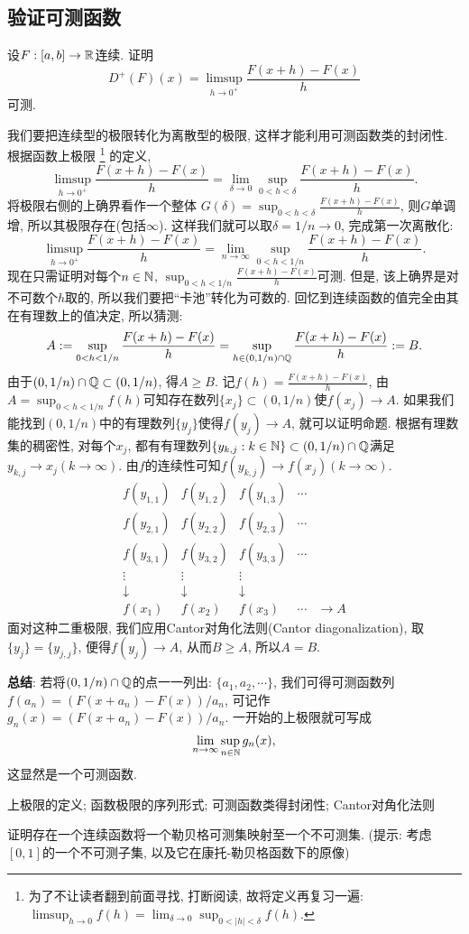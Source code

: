 \subsection{验证可测函数}
\begin{example}[~(Dini导数)] %
    设$F: [a,b] \to \mathbb{R}$连续. 证明
    $$D^+(F)(x) = \limsup_{h \to 0^+}\frac{F(x+h)-F(x)}{h}$$
    可测. 
\end{example}
\begin{solution}
    我们要把连续型的极限转化为离散型的极限, 这样才能利用可测函数类的封闭性. 根据函数上极限
    \footnote{为了不让读者翻到前面寻找, 打断阅读, 故将定义再复习一遍: $\limsup_{h \to 0}f(h) = \lim_{\delta \to  0} \sup_{0<|h|<\delta} f(h)$.}
    的定义,
    $$\limsup_{h \to 0^+}\frac{F(x+h)-F(x)}{h} = 
    \lim_{\delta \to 0}\sup_{0<h<\delta}\frac{F(x+h)-F(x)}{h}.$$
    将极限右侧的上确界看作一个整体
    $\displaystyle{G(\delta)=\sup_{0<h<\delta}\frac{F(x+h)-F(x)}{h} }$, 则$G$单调增, 所以其极限存在(包括$\infty$). 这样我们就可以取$\delta=1/n \to 0$, 完成第一次离散化:
    $$\limsup_{h \to 0^+}\frac{F(x+h)-F(x)}{h} = 
    \lim_{n \to \infty}\sup_{0<h<1/n}\frac{F(x+h)-F(x)}{h}.$$
    现在只需证明对每个$n \in \mathbb{N}$, $\displaystyle{\sup_{0<h<1/n}\frac{F(x+h)-F(x)}{h}}$可测.
    但是, 该上确界是对不可数个$h$取的, 所以我们要把“卡池”转化为可数的. 回忆到连续函数的值完全由其在有理数上的值决定, 所以猜测:
    $$A := \sup_{0<h<1/n}\frac{F(x+h)-F(x)}{h}=\sup_{h \in (0, 1/n) \cap \mathbb{Q}}
    \frac{F(x+h)-F(x)}{h} := B.$$
    由于$(0,1/n)\cap \mathbb{Q} \subset (0, 1/n)$, 得$A \geq B$. 
    记$\displaystyle{f(h)=\frac{F(x+h)-F(x)}{h}}$, 由$A=\sup_{0<h<1/n}f(h)$可知存在数列$\{x_j\} \subset (0,1/n)$使$f(x_j) \to A$. 如果我们能找到$(0,1/n)$中的有理数列$\{y_j\}$使得$f(y_j) \to A$, 就可以证明命题. 根据有理数集的稠密性, 对每个$x_j$, 都有有理数列$\{y_{k,j}:k \in \mathbb{N} \} \subset (0, 1/n) \cap \mathbb{Q}$满足$y_{k,j} \to x_j (k \to \infty)$. 由$f$的连续性可知$f(y_{k,j}) \to f(x_j) (k \to \infty)$. 
    $$\begin{matrix}
        f(y_{1,1}) & f(y_{1,2}) & f(y_{1,3}) & \cdots & \\
        f(y_{2,1}) & f(y_{2,2}) & f(y_{2,3}) & \cdots & \\
        f(y_{3,1}) & f(y_{3,2}) & f(y_{3,3}) & \cdots & \\
        \vdots  & \vdots  & \vdots  &  \\
        \downarrow & \downarrow & \downarrow &  \\
        f(x_1)     & f(x_2)     & f(x_3)     & \cdots & \to A
    \end{matrix}$$
    面对这种二重极限, 我们应用Cantor对角化法则(Cantor diagonalization), 取$\{y_j\}=\{y_{j,j}\}$, 便得$f(y_{j}) \to A$, 从而$B\geq A$, 所以$A=B$. 
\end{solution}
\textbf{总结}: 
    若将$(0,1/n) \cap \mathbb{Q}$的点一一列出: $\{a_1, a_2, \cdots\}$, 我们可得可测函数列
    $f(a_n)=(F(x+a_n)-F(x))/a_n$, 可记作$g_n(x)=(F(x+a_n)-F(x))/a_n$. 一开始的上极限就可写成
    $$\lim_{n\to \infty}\sup_{n \in \mathbb{N}} g_n(x),$$
    这显然是一个可测函数. 
    
\begin{knowledge}
    上极限的定义; 函数极限的序列形式; 可测函数类得封闭性; Cantor对角化法则
\end{knowledge}

\begin{exercise} %
    证明存在一个连续函数将一个勒贝格可测集映射至一个不可测集. (提示: 考虑$[0,1]$的一个不可测子集, 以及它在康托-勒贝格函数下的原像)
\end{exercise}
